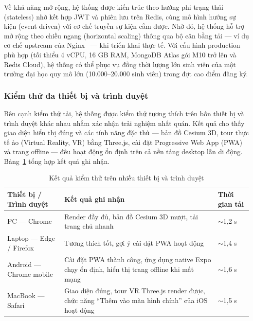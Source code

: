 \documentclass[../DoAn.tex]{subfiles}
\begin{document}
Về khả năng mở rộng, hệ thống được kiến trúc theo hướng phi trạng thái (stateless)
nhờ kết hợp JWT và phiên lưu trên Redis, cùng mô hình hướng sự kiện (event-driven)
với cơ chế truyền sự kiện cắm được. Nhờ đó, hệ thống hỗ trợ mở rộng theo chiều
ngang (horizontal scaling) thông qua bộ cân bằng tải --- ví dụ cơ chế upstream của
Nginx~\cite{nginx_docs} --- khi triển khai thực tế. Với cấu hình production phù hợp
(tối thiểu 4 vCPU, 16 GB RAM, MongoDB Atlas gói M10 trở lên và Redis Cloud), hệ
thống có thể phục vụ đồng thời lượng lớn sinh viên của một trường đại học quy mô
lớn (10.000--20.000 sinh viên) trong đợt cao điểm đăng ký.

\subsubsection*{Kiểm thử đa thiết bị và trình duyệt}

Bên cạnh kiểm thử tải, hệ thống được kiểm thử tương thích trên bốn thiết bị và
trình duyệt khác nhau nhằm xác nhận trải nghiệm nhất quán. Kết quả cho thấy giao
diện hiển thị đúng và các tính năng đặc thù --- bản đồ Cesium 3D, tour thực tế ảo
(Virtual Reality, VR) bằng Three.js, cài đặt Progressive Web App (PWA) và trang
offline --- đều hoạt động ổn định trên cả nền tảng desktop lẫn di động.
Bảng~\ref{tab:cross-device-test} tổng hợp kết quả ghi nhận.

\begin{table}[H]
\centering
\caption{Kết quả kiểm thử trên nhiều thiết bị và trình duyệt}
\label{tab:cross-device-test}
\footnotesize
\begin{tabular}{|p{3.4cm}|p{8.2cm}|p{1.8cm}|}
\hline
\textbf{Thiết bị / Trình duyệt} & \textbf{Kết quả ghi nhận} & \textbf{Thời gian tải} \\
\hline
PC --- Chrome & Render đầy đủ, bản đồ Cesium 3D mượt, tải trang chủ nhanh & $\sim$1,2 s \\
\hline
Laptop --- Edge / Firefox & Tương thích tốt, gợi ý cài đặt PWA hoạt động & $\sim$1,4 s \\
\hline
Android --- Chrome mobile & Cài đặt PWA thành công, ứng dụng native Expo chạy ổn định, hiển thị trang offline khi mất mạng & $\sim$1,6 s \\
\hline
MacBook --- Safari & Giao diện đúng, tour VR Three.js render được, chức năng ``Thêm vào màn hình chính'' của iOS hoạt động & $\sim$1,5 s \\
\hline
\end{tabular}
\end{table}
\end{document}
